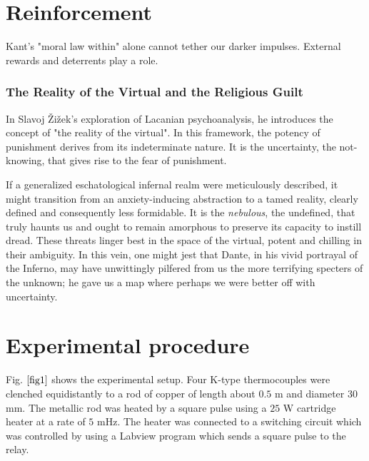\documentclass[12pt,a4]{article}
\begin{document}
\section{Reinforcement}
Kant's "moral law within" alone cannot tether our darker impulses. External rewards and deterrents play a role.
\par
\subsubsection{The Reality of the Virtual and the Religious Guilt}
In Slavoj Žižek's exploration of Lacanian psychoanalysis, he introduces the concept of "the reality of the virtual".
In this framework, the potency of punishment derives from its indeterminate nature. It is the uncertainty, the not-knowing, that gives rise to the fear of punishment. 
\par
If a generalized eschatological infernal realm were meticulously described, it might transition from an anxiety-inducing abstraction to a tamed reality, clearly defined and consequently less formidable. It is the \textit{nebulous}, the undefined, that truly haunts us and ought to remain amorphous to preserve its capacity to instill dread. These threats linger best in the space of the virtual, potent and chilling in their ambiguity. In this vein, one might jest that Dante, in his vivid portrayal of the Inferno, may have unwittingly pilfered from us the more terrifying specters of the unknown; he gave us a map where perhaps we were better off with uncertainty.


\section{Experimental procedure}


Fig. $\ref{fig1}$ shows the experimental setup. Four K-type thermocouples were clenched equidistantly to a rod of copper of length about $0.5$ m and diameter $30$ mm. The metallic rod was heated by a square pulse using a $25$ W cartridge heater at a rate of $5$ mHz. The heater was connected to a switching circuit which was controlled by using a Labview program which sends a square pulse to the relay.
\end{document}
